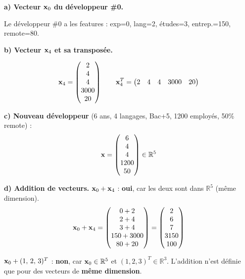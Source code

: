 \separateur

\textbf{a) Vecteur $\mathbf{x}_0$ du d\'{e}veloppeur \#0.}

Le d\'{e}veloppeur \#0 a les features : exp=0, lang=2, \'{e}tudes=3, entrep.=150, remote=80.


\textbf{b) Vecteur $\mathbf{x}_4$ et sa transpos\'{e}e.}

\[
    \mathbf{x}_4 = \begin{pmatrix} 2 \\ 4 \\ 4 \\ 3000 \\ 20 \end{pmatrix}
    \qquad
    \mathbf{x}_4^T = \begin{pmatrix} 2 & 4 & 4 & 3000 & 20 \end{pmatrix}
\]

\textbf{c) Nouveau d\'{e}veloppeur} (6 ans, 4 langages, Bac+5, 1200 employ\'{e}s, 50\% remote) :
\[
    \mathbf{x} = \begin{pmatrix} 6 \\ 4 \\ 4 \\ 1200 \\ 50 \end{pmatrix} \in \mathbb{R}^5
\]

\textbf{d) Addition de vecteurs.}
$\mathbf{x}_0 + \mathbf{x}_4$ : \textbf{oui}, car les deux sont dans $\mathbb{R}^5$ (m\^{e}me dimension).
\[
    \mathbf{x}_0 + \mathbf{x}_4 = \begin{pmatrix} 0+2 \\ 2+4 \\ 3+4 \\ 150+3000 \\ 80+20 \end{pmatrix}
    = \begin{pmatrix} 2 \\ 6 \\ 7 \\ 3150 \\ 100 \end{pmatrix}
\]

$\mathbf{x}_0 + (1,\, 2,\, 3)^T$ : \textbf{non}, car $\mathbf{x}_0 \in \mathbb{R}^5$ et $(1,2,3)^T \in \mathbb{R}^3$.
L'addition n'est d\'{e}finie que pour des vecteurs de \textbf{m\^{e}me dimension}.

